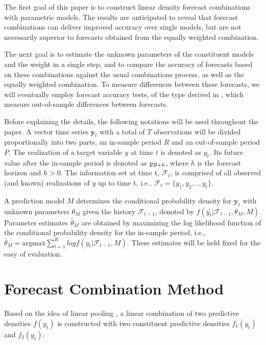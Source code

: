 \documentclass{monashthesis}
\begin{document}
The first goal of this paper is to construct linear density forecast combinations with parametric models. The results are anticipated to reveal that forecast combinations can deliver improved accuracy over single models, but are not necessarily superior to forecasts obtained from the equally weighted combination.

The next goal is to estimate the unknown parameters of the constituent models and the weight in a single step, and to compare the accuracy of forecasts based on these combinations against the usual combinations process, as well as the equally weighted combination. To measure differences between these forecasts, we will eventually employ forecast accuracy tests, of the type derived in \textcite{W96}, which measure out-of-sample differences between forecasts.

Before explaining the details, the following notations will be used throughout the paper. A vector time series \(\textbf{y}_t\) with a total of \(T\) observations will be divided proportionally into two parts, an in-sample period \(R\) and an out-of-sample period \(P\). The realization of a target variable \(y\) at time \(t\) is denoted as \(y_{t}\). Its future value after the in-sample period is denoted as \(y_{\small{R+h}}\), where \(h\) is the forecast horizon and \(h>0\). The information set at time t, \(\mathcal{F}_t\), is comprised of all observed (and known) realizations of \(y\) up to time t, i.e., \(\mathcal{F}_t = \{y_1, y_2, .., y_t\}\).

A prediction model \(M\) determines the conditional probability density for \(\textbf{y}_t\) with unknown parameters \(\theta_M\) given the history \(\mathcal{F}_{t-1}\), denoted by \(f(y_t|\mathcal{F}_{t-1}, \theta_M, M)\). Parameter estimates \(\hat\theta_M\) are obtained by maximizing the log likelihood function of the conditional probability density for the in-sample period, i.e., \(\hat\theta_M = \text{argmax} \sum^R_{t=1} log f(y_t|\mathcal{F}_{t-1}, M)\). These estimates will be held fixed for the easy of evaluation.

\hypertarget{forecast-combination-method}{%
\section{Forecast Combination Method}\label{forecast-combination-method}}

Based on the idea of linear pooling \autocite{BG69,HM07,GA11}, a linear combination of two predictive densities \(f(y_t)\) is constructed with two constituent predictive densities \(f_1(y_t)\) and \(f_2(y_t)\):
\end{document}
